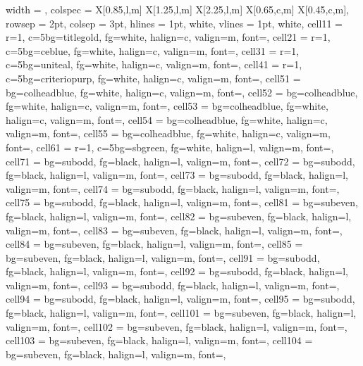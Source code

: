 \documentclass[a4paper,12pt]{article}
\begin{document}
\noindent
\noindent
\begin{longtblr}{
  width = \textwidth,
  colspec = {X[0.85,l,m] X[1.25,l,m] X[2.25,l,m] X[0.65,c,m] X[0.45,c,m]},
  rowsep = 2pt,
  colsep = 3pt,
  hlines = {1pt, white},
  vlines = {1pt, white},
  cell{1}{1} = {r=1, c=5}{bg=titlegold, fg=white, halign=c, valign=m, font=\large\bfseries},
  cell{2}{1} = {r=1, c=5}{bg=ceblue, fg=white, halign=c, valign=m, font=\small\bfseries},
  cell{3}{1} = {r=1, c=5}{bg=uniteal, fg=white, halign=c, valign=m, font=\small\bfseries},
  cell{4}{1} = {r=1, c=5}{bg=criteriopurp, fg=white, halign=c, valign=m, font=\small\bfseries},
  cell{5}{1} = {bg=colheadblue, fg=white, halign=c, valign=m, font=\bfseries},
  cell{5}{2} = {bg=colheadblue, fg=white, halign=c, valign=m, font=\bfseries},
  cell{5}{3} = {bg=colheadblue, fg=white, halign=c, valign=m, font=\bfseries},
  cell{5}{4} = {bg=colheadblue, fg=white, halign=c, valign=m, font=\bfseries},
  cell{5}{5} = {bg=colheadblue, fg=white, halign=c, valign=m, font=\bfseries},
  cell{6}{1} = {r=1, c=5}{bg=sbgreen, fg=white, halign=l, valign=m, font=\small\bfseries},
  cell{7}{1} = {bg=subodd, fg=black, halign=l, valign=m, font=\footnotesize},
  cell{7}{2} = {bg=subodd, fg=black, halign=l, valign=m, font=\footnotesize},
  cell{7}{3} = {bg=subodd, fg=black, halign=l, valign=m, font=\footnotesize},
  cell{7}{4} = {bg=subodd, fg=black, halign=l, valign=m, font=\footnotesize},
  cell{7}{5} = {bg=subodd, fg=black, halign=l, valign=m, font=\footnotesize},
  cell{8}{1} = {bg=subeven, fg=black, halign=l, valign=m, font=\footnotesize},
  cell{8}{2} = {bg=subeven, fg=black, halign=l, valign=m, font=\footnotesize},
  cell{8}{3} = {bg=subeven, fg=black, halign=l, valign=m, font=\footnotesize},
  cell{8}{4} = {bg=subeven, fg=black, halign=l, valign=m, font=\footnotesize},
  cell{8}{5} = {bg=subeven, fg=black, halign=l, valign=m, font=\footnotesize},
  cell{9}{1} = {bg=subodd, fg=black, halign=l, valign=m, font=\footnotesize},
  cell{9}{2} = {bg=subodd, fg=black, halign=l, valign=m, font=\footnotesize},
  cell{9}{3} = {bg=subodd, fg=black, halign=l, valign=m, font=\footnotesize},
  cell{9}{4} = {bg=subodd, fg=black, halign=l, valign=m, font=\footnotesize},
  cell{9}{5} = {bg=subodd, fg=black, halign=l, valign=m, font=\footnotesize},
  cell{10}{1} = {bg=subeven, fg=black, halign=l, valign=m, font=\footnotesize},
  cell{10}{2} = {bg=subeven, fg=black, halign=l, valign=m, font=\footnotesize},
  cell{10}{3} = {bg=subeven, fg=black, halign=l, valign=m, font=\footnotesize},
  cell{10}{4} = {bg=subeven, fg=black, halign=l, valign=m, font=\footnotesize},
}
\end{longtblr}
\end{document}
